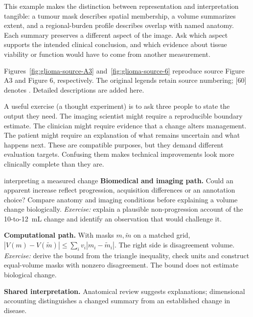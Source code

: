 \documentclass[11pt,a4paper]{article}
\begin{document}
This example makes the distinction between representation and interpretation tangible: a tumour mask describes spatial membership, a volume summarizes extent, and a regional-burden profile describes overlap with named anatomy. Each summary preserves a different aspect of the image. Ask which aspect supports the intended clinical conclusion, and which evidence about tissue viability or function would have to come from another measurement.

Figures~\ref{fig:glioma-source-A3} and~\ref{fig:glioma-source-6} reproduce source Figure A3 and Figure 6, respectively. The original legends retain source numbering; [60] denotes \citet{suter2022}. Detailed descriptions are added here.

A useful exercise (a thought experiment) is to ask three people to state the output they need. The imaging scientist might require a reproducible boundary estimate. The clinician might require evidence that a change alters management. The patient might require an explanation of what remains uncertain and what happens next. These are compatible purposes, but they demand different evaluation targets. Confusing them makes technical improvements look more clinically complete than they are.

\begin{perspectives}{interpreting a measured change}
\textbf{Biomedical and imaging path.} Could an apparent increase reflect progression, acquisition differences or an annotation choice? Compare anatomy and imaging conditions before explaining a volume change biologically. \emph{Exercise:} explain a plausible non-progression account of the 10-to-12~mL change and identify an observation that would challenge it.

\textbf{Computational path.} With masks $m,\tilde m$ on a matched grid, $|V(m)-V(\tilde m)|\leq\sum_i v_i|m_i-\tilde m_i|$. The right side is disagreement volume. \emph{Exercise:} derive the bound from the triangle inequality, check units and construct equal-volume masks with nonzero disagreement. The bound does not estimate biological change.

\textbf{Shared interpretation.} Anatomical review suggests explanations; dimensional accounting distinguishes a changed summary from an established change in disease.
\end{perspectives}

\end{document}
